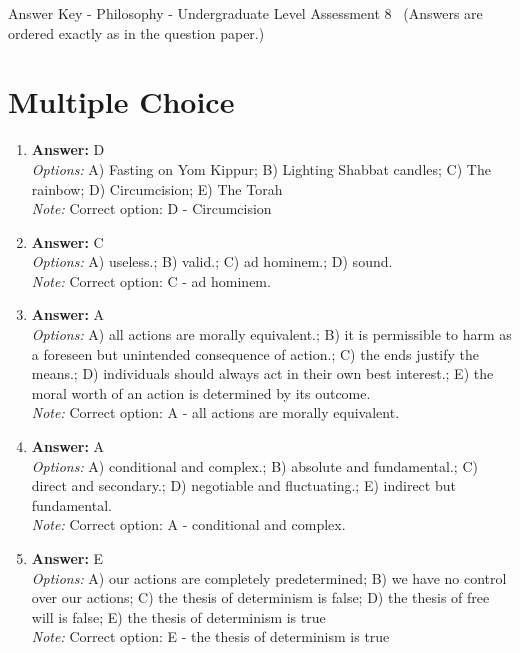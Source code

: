 \documentclass[12pt]{article}
\begin{document}
\begin{center}
Answer Key - Philosophy - Undergraduate Level Assessment 8 \
\small (Answers are ordered exactly as in the question paper.)
\end{center}

\section*{Multiple Choice}
\begin{enumerate}[label=\arabic*.]
\item \textbf{Answer:} D
\\ \textit{Options:} A) Fasting on Yom Kippur; B) Lighting Shabbat candles; C) The rainbow; D) Circumcision; E) The Torah
\\ \textit{Note:} Correct option: D - Circumcision
\item \textbf{Answer:} C
\\ \textit{Options:} A) useless.; B) valid.; C) ad hominem.; D) sound.
\\ \textit{Note:} Correct option: C - ad hominem.
\item \textbf{Answer:} A
\\ \textit{Options:} A) all actions are morally equivalent.; B) it is permissible to harm as a foreseen but unintended consequence of action.; C) the ends justify the means.; D) individuals should always act in their own best interest.; E) the moral worth of an action is determined by its outcome.
\\ \textit{Note:} Correct option: A - all actions are morally equivalent.
\item \textbf{Answer:} A
\\ \textit{Options:} A) conditional and complex.; B) absolute and fundamental.; C) direct and secondary.; D) negotiable and fluctuating.; E) indirect but fundamental.
\\ \textit{Note:} Correct option: A - conditional and complex.
\item \textbf{Answer:} E
\\ \textit{Options:} A) our actions are completely predetermined; B) we have no control over our actions; C) the thesis of determinism is false; D) the thesis of free will is false; E) the thesis of determinism is true
\\ \textit{Note:} Correct option: E - the thesis of determinism is true
\end{enumerate}
\end{document}
